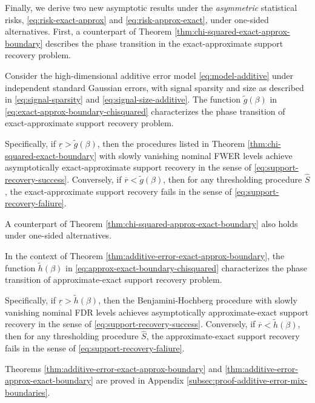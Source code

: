 Finally, we derive two new asymptotic results under the \emph{asymmetric} statistical risks, \eqref{eq:risk-exact-approx} and \eqref{eq:risk-approx-exact}, under one-sided alternatives.
First, a counterpart of Theorem \ref{thm:chi-squared-exact-approx-boundary} describes the phase transition in the exact-approximate support recovery problem.

\begin{theorem} \label{thm:additive-error-exact-approx-boundary}
Consider the high-dimensional additive error model \eqref{eq:model-additive} under independent standard Gaussian errors, with signal sparsity and size as described in \eqref{eq:signal-sparsity} and \eqref{eq:signal-size-additive}.
The function $\widetilde{g}(\beta)$ in \eqref{eq:exact-approx-boundary-chisquared} characterizes the phase transition of exact-approximate support recovery problem.

Specifically, if $\underline{r} > \widetilde{g}(\beta)$, then the procedures listed in Theorem \ref{thm:chi-squared-exact-boundary} with slowly vanishing nominal FWER levels achieve asymptotically exact-approximate support recovery in the sense of \eqref{eq:support-recovery-success}. 
Conversely, if $\overline{r} < \widetilde{g}(\beta)$, then for any thresholding procedure $\widehat{S}$, the exact-approximate support recovery fails in the sense of \eqref{eq:support-recovery-faliure}.
\end{theorem}

A counterpart of Theorem \ref{thm:chi-squared-approx-exact-boundary} also holds under one-sided alternatives.

\begin{theorem} \label{thm:additive-error-approx-exact-boundary}
In the context of Theorem \ref{thm:additive-error-exact-approx-boundary}, the function $\widetilde{h}(\beta)$ in \eqref{eq:approx-exact-boundary-chisquared}
characterizes the phase transition of approximate-exact support recovery problem.

Specifically, if $\underline{r} > \widetilde{h}(\beta)$, then the Benjamini-Hochberg procedure with slowly vanishing nominal FDR levels achieves asymptotically approximate-exact support recovery in the sense of \eqref{eq:support-recovery-success}. 
Conversely, if $\overline{r} < \widetilde{h}(\beta)$, then for any thresholding procedure $\widehat{S}$, the approximate-exact support recovery fails in the sense of \eqref{eq:support-recovery-faliure}.
\end{theorem}

Theorems \ref{thm:additive-error-exact-approx-boundary} and \ref{thm:additive-error-approx-exact-boundary} are proved in Appendix \ref{subsec:proof-additive-error-mix-boundaries}. 

